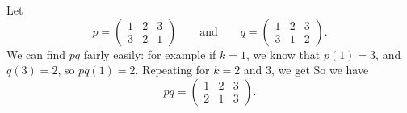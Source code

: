 \begin{example}
  Let
  \[
    p = \begin{pmatrix}
      1 & 2 & 3 \\
      3 & 2 & 1
    \end{pmatrix}
    \qquad \text{and} \qquad
    q = \begin{pmatrix}
      1 & 2 & 3 \\
      3 & 1 & 2
    \end{pmatrix}.
  \]
  We can find $pq$ fairly easily: for example if
  $k=1$, we know that $p(1) = 3$, and $q(3) = 2$, so $pq(1) = 2$. Repeating
  for $k = 2$ and $3$, we get So
  we have
  \[
    pq = \begin{pmatrix}
      1 & 2 & 3 \\
      2 & 1 & 3
    \end{pmatrix}.
  \]
\end{example}


